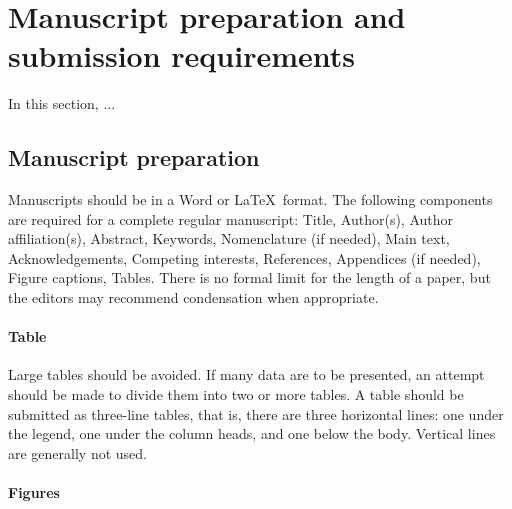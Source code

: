 \documentclass[review]{fcs}
\begin{document}
\section{Manuscript preparation and submission requirements}

In this section,  ...

\subsection{Manuscript preparation}

Manuscripts should be in a Word or \LaTeX\ format. The following components are required for a complete regular manu\-script: Title, Author(s), Author affiliation(s), Abstract, Keywords, Nomenclature (if needed), Main text, Acknowledgements, Competing interests, References, Appendices (if need\-ed), Figure captions, Tables. There is no formal limit for the length of a paper, but the editors may recommend condensation when appropriate.

\paragraph{Table}

Large tables should be avoided. If many data are to be presented, an attempt should be made to divide them into two or more tables.
A table should be submitted as three-line tables, that is, there are three horizontal lines: one under the legend, one under the column heads, and one below the body. Vertical lines are generally not used.

\paragraph{Figures}
\end{document}
